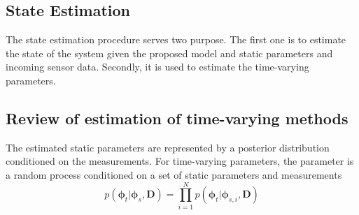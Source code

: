 \documentclass[]{elsarticle}
\renewcommand{\vec}[1]{\mathbf{#1}}
\begin{document}
\subsection*{State Estimation}

The state estimation procedure serves two purpose. The first one is to estimate the state of the system given the proposed model and static parameters and incoming sensor data. Secondly, it is used to estimate the time-varying parameters. 

 

\subsection{Review of estimation of time-varying methods}



The estimated static parameters are represented by a posterior distribution conditioned on the measurements. For time-varying parameters, the parameter is a random process conditioned on a set of static parameters and measurements
\begin{equation}
p( \vec{\phi}_t | \vec{\phi}_s, \vec{D}) = \prod\limits_{i=1}^N p( \vec{\phi}_t | \vec{\phi}_{s,i}, \vec{D} )
\end{equation}
\end{document}
